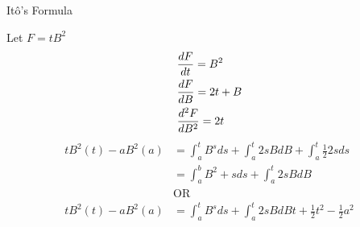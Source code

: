 \begin{frame}{It\^o's Formula} 

Let $F=tB^2$ 
\begin{align*}
\displaystyle
&\frac{dF}{dt}= B^2\\
&\frac{dF}{dB}=2t+B\\ 
&\frac{d^2 F}{dB^2}=2t
\end{align*}
\begin{align*}
tB^2(t)-aB^2(a) &=\int_{a}^{t}B^s ds+ \int_{a}^{t}2sBdB+\int_a^t \frac{1}{2}2sds\\
 &=\int_a^b B^2+sds+\int_a^t 2sBdB\\
 &\text{OR}\\
tB^2(t)-aB^2(a) &= \int_a^t B^s ds+ \int_a^t 2sBdBt+ \frac{1}{2} t^2- \frac{1}{2}a^2
\end{align*}
\end{frame}





%

